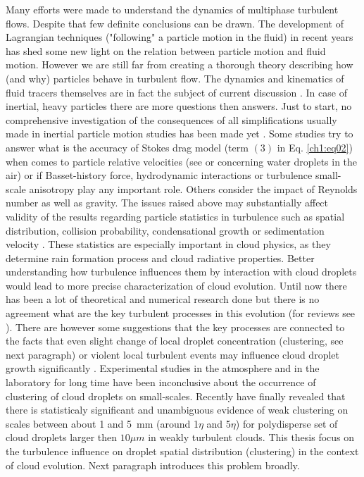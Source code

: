 \documentclass[../main.tex]{subfiles}
\begin{document}
Many efforts were made to understand the dynamics of multiphase turbulent flows. Despite that few definite conclusions can be drawn. The development of Lagrangian techniques ("following" a particle motion in the fluid) in recent years has shed some new light on the relation between particle motion and fluid motion. However we are still far from creating a thorough theory describing how (and why) particles behave in turbulent flow. The dynamics and kinematics of fluid tracers themselves are in fact the subject of current discussion \citep{Biferale2005,Arneodo2008, Toschi2009,Scatamacchia2012,Dhariwal2018}. In case of inertial, heavy particles there are more questions then answers. Just to start, no comprehensive investigation of the consequences of all simplifications usually made in inertial particle motion studies has been made yet \citep{Bourgoin2014}. Some studies try to answer what is the accuracy of Stokes drag model (term $(3)$ in Eq. \ref{ch1:eq02}) when comes to particle relative velocities (see \citet{Dou2018} or \citet{Saw2014} concerning water droplets in the air) or if Basset-history force,  hydrodynamic interactions or turbulence small-scale anisotropy play any important role. Others consider the impact of Reynolds number as well as gravity\citep{Ireland2016a, Ireland2016b}. The issues raised above may substantially affect validity of the results regarding particle statistics in turbulence such as spatial distribution, collision probability, condensational growth or sedimentation velocity \citep{Chen2018}. These statistics are especially important in cloud physics, as they determine rain formation process and cloud radiative properties. Better understanding how turbulence influences them by interaction with cloud droplets would lead to more precise characterization of cloud evolution\citep{Bodenschatz2010}. Until now there has been a lot of theoretical and numerical research done but there is no agreement what are the key turbulent processes in this evolution (for reviews see \citet{Vaillancourt2000, Shaw2003, Devenish2012, Grabowski2013, Pumir2016, Saito2018}). There are however some suggestions that the key processes are connected to the facts that even slight change of local droplet concentration (clustering, see next paragraph) or violent local turbulent events may influence cloud droplet growth significantly \citep{Kostinski2005, Bec2016, Madival2019}. Experimental studies in the atmosphere \citep{Chaumat2001, Pinsky2001, Kostinski2001, Shaw2002, Knyazikhin2005, Marshak2005, Lehmann2007, Glienke2017} and in the laboratory \citep{Jaczewski2005, Warhaft2008} for long time have been inconclusive about the occurrence of clustering of cloud droplets on small-scales. Recently \citet{Larsen2018} have finally revealed that there is statisticaly significant and unambiguous evidence of weak clustering on scales between about 1 and 5~mm (around 1$\eta$ and 5$\eta$) for polydisperse set of cloud droplets larger then $10\mu m$ in weakly turbulent clouds. This thesis focus on the turbulence influence on droplet spatial distribution (clustering) in the context of cloud evolution. Next paragraph introduces this problem broadly.\\
\end{document}
